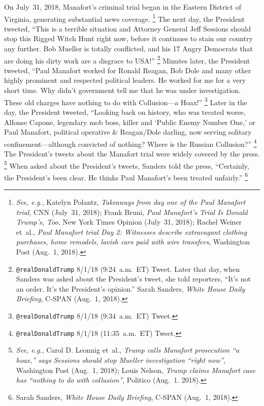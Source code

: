 On July~31, 2018, Manafort's criminal trial began in the Eastern District of Virginia, generating substantial news coverage.%
\footnote{\textit{See, e.g.}, Katelyn Polantz, \textit{Takeaways from day one of the Paul Manafort trial}, CNN (July~31, 2018);
Frank Bruni, \textit{Paul Manafort's Trial Is Donald Trump's, Too}, New York Times Opinion (July~31, 2018);
Rachel Weiner et~al., \textit{Paul Manafort trial Day 2: Witnesses describe extravagant clothing purchases, home remodels, lavish cars paid with wire transfers}, Washington Post (Aug.~1, 2018).}
The next day, the President tweeted, ``This is a terrible situation and Attorney General Jeff Sessions should stop this Rigged Witch Hunt right now, before it continues to stain our country any further.
Bob Mueller is totally conflicted, and his 17 Angry Democrats that are doing his dirty work are a disgrace to USA!''%
\footnote{\verb+@realDonaldTrump+ 8/1/18 (9:24~a.m.~ET) Tweet.
Later that day, when Sanders was asked about the President's tweet, she told reporters, ``It's not an order.
It's the President's opinion.''
Sarah Sanders, \textit{White House Daily Briefing}, C-SPAN (Aug.~1, 2018).}
Minutes later, the President tweeted, ``Paul Manafort worked for Ronald Reagan, Bob Dole and many other highly prominent and respected political leaders.
He worked for me for a very short time.
Why didn't government tell me that he was under investigation.
These old charges have nothing to do with Collusion---a Hoax!''%
\footnote{\verb+@realDonaldTrump+ 8/1/18 (9:34~a.m.~ET) Tweet.}
Later in the day, the President tweeted, ``Looking back on history, who was treated worse, Alfonse Capone, legendary mob boss, killer and `Public Enemy Number One,' or Paul Manafort, political operative \& Reagan/Dole darling, now serving solitary confinement---although convicted of nothing?
Where is the Russian Collusion?''%
\footnote{\verb+@realDonaldTrump+ 8/1/18 (11:35~a.m.~ET) Tweet.}
The President's tweets about the Manafort trial were widely covered by the press.%
\footnote{\textit{See, e.g.}, Carol D. Leonnig et~al., \textit{Trump calls Manafort prosecution ``a hoax,'' says Sessions should stop Mueller investigation ``right now''}, Washington Post (Aug.~1, 2018);
Louis Nelson, \textit{Trump claims Manafort case has ``nothing to do with collusion''}, Politico (Aug.~1. 2018).}
When asked about the President's tweets, Sanders told the press, ``Certainly, the President's been clear.
He thinks Paul Manafort's been treated unfairly.''%
\footnote{Sarah Sanders, \textit{White House Daily Briefing}, C-SPAN (Aug.~1, 2018).}

